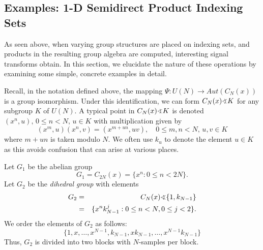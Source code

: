 %

\subsection{Examples: 1-D Semidirect Product Indexing Sets}
As seen above, when varying group structures are placed on indexing sets,
and products in the resulting group algebra are computed, 
interesting signal transforms obtain.  In this section,
we elucidate the nature of these operations by
examining some simple, concrete examples in detail.

Recall, in the notation 
defined above,
the mapping $\Psi: U(N) \to Aut(C_N(x))$ is a group
isomorphism.
Under this identification, we can form $C_N(x)\sdp K$
for any subgroup $K$ of $U(N)$.  A typical point in 
$C_N(x)\sdp K$ is denoted 
$(x^n, u), \, 0\leq n<N,\, u\in K$ with multiplication given
by  
\[
(x^m, u)(x^n, v) = (x^{m+un},uv), \quad 
0\leq m, n < N,\, u, v \in K
\]
where $m+un$ is taken modulo $N$.
We often use $k_u$ to denote the element $u\in K$ as this
avoids confusion that can arise at various places.

\begin{example}\protect\hspace{-1mm}\footnotemark
{}
\label{ex:g2}
Let $G_1$ be the abelian group 
\begin{equation}
G_1 = C_{2N}(x) = \{x^n : 0 \leq n < 2N\}. %
\end{equation}
Let $G_2$ be the \emph{dihedral group} %
with elements
\begin{eqnarray*}
G_2&=& C_N(x) \sdp \{1, k_{N-1}\}\\
&=& \{x^n k_{N-1}^j : 0 \leq n < N, 0 \leq j < 2\}.
\end{eqnarray*}
We order the elements of $G_2$ as follows:
\[
\{1, x, \ldots, x^{N-1}, k_{N-1}, xk_{N-1}, \ldots, x^{N-1}
k_{N-1}\}
\]
Thus, $G_2$ is divided into two blocks with $N$-samples per block.
\end{example}

